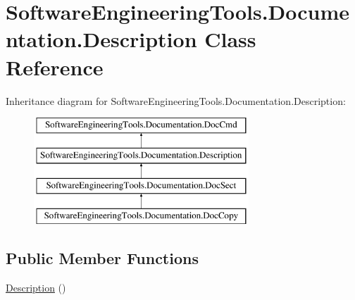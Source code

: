 \hypertarget{class_software_engineering_tools_1_1_documentation_1_1_description}{\section{Software\+Engineering\+Tools.\+Documentation.\+Description Class Reference}
\label{class_software_engineering_tools_1_1_documentation_1_1_description}
}
Inheritance diagram for Software\+Engineering\+Tools.\+Documentation.\+Description\+:\begin{figure}[H]
\begin{center}
\leavevmode
\includegraphics[height=4.000000cm]{class_software_engineering_tools_1_1_documentation_1_1_description}
\end{center}
\end{figure}
\subsection*{Public Member Functions}
\begin{DoxyCompactItemize}
\item 
\hyperlink{class_software_engineering_tools_1_1_documentation_1_1_description_af6858f1c08f3411ed90e344ba0eac0bd}{Description} ()
\end{DoxyCompactItemize}
